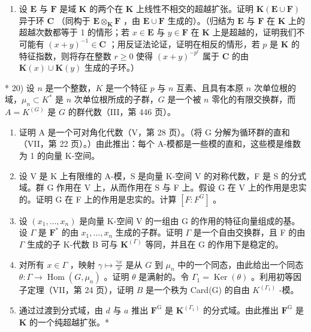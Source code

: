 \begin{enumerate}
\def\labelenumi{\arabic{enumi})}
\setcounter{enumi}{18}
\tightlist
\item
  设 \(\mathbf{E}\) 与 \(\mathbf{F}\) 是域 \(\mathbf{K}\) 的两个在 \(\mathbf{K}\) 上线性不相交的超越扩张。证明 \(\mathbf{K}(\mathbf{E} \cup \mathbf{F})\) 异于环 \(\mathbf{C}\) （同构于 \(\mathbf{E} \otimes_{\mathbf{K}} \mathbf{F}\) ，由 \(\mathbf{E} \cup \mathbf{F}\) 生成的）。（归结为 \(\mathbf{E}\) 与 \(\mathbf{F}\) 在 \(\mathbf{K}\) 上的超越次数都等于 1 的情形；若 \(x \in \mathbf{E}\) 与 \(y \in \mathbf{F}\) 在 \(\mathbf{K}\) 上是超越的，证明我们不可能有 \((x + y)^{-1} \in \mathbf{C}\) ；用反证法论证，证明在相反的情形，若 \(p\) 是 \(\mathbf{K}\) 的特征指数，则将存在整数 \(r \geqslant 0\) 使得 \((x + y)^{-p^r}\) 属于 \(\mathbf{C}\) 的由 \(\mathbf{K}(x) \cup \mathbf{K}(y)\) 生成的子环。）
\end{enumerate}

* 20) 设 \(n\) 是一个整数，\(K\) 是一个特征 \(p\) 与 \(n\) 互素、且具有本原 \(n\) 次单位根的域，\(\mu_n \subset K^*\) 是 \(n\) 次单位根所成的子群，\(G\) 是一个被 \(n\) 零化的有限交换群，而 \(A = K^{(G)}\) 是 \(G\) 的群代数（III，第 446 页）。

\begin{enumerate}
\def\labelenumi{\alph{enumi})}
\item
  证明 A 是一个可对角化代数（V，第 28 页）。（将 G 分解为循环群的直和（VII，第 22 页）。）由此推出：每个 A-模都是一些模的直和，这些模是维数为 1 的向量 K-空间。
\item
  设 V 是 K 上有限维的 A-模，S 是向量 K-空间 V 的对称代数，F 是 S 的分式域。群 G 作用在 V 上，从而作用在 S 与 F 上。假设 G 在 V 上的作用是忠实的。证明 G 在 F 上的作用是忠实的。计算 \([F : F^{G}]\) 。
\item
  设 \((x_{1},\ldots ,x_{n})\) 是向量 K-空间 V 的一组由 G 的作用的特征向量组成的基。设 \(\Gamma\) 是 \(\mathbf{F}^*\) 的由 \(x_{1},\ldots ,x_{n}\) 生成的子群。证明 \(\Gamma\) 是一个自由交换群，且 F 的由 \(\Gamma\) 生成的子 K-代数 B 可与 \(\mathbf{K}^{(\Gamma)}\) 等同，并且在 G 的作用下是稳定的。
\item
  对所有 \(x \in \Gamma\) ，映射 \(\gamma \mapsto \frac{\gamma x}{x}\) 是从 \(G\) 到 \(\mu_n\) 中的一个同态，由此给出一个同态 \(\theta: \Gamma \to \operatorname{Hom}(G, \mu_n)\) 。证明 \(\theta\) 是满射的。令 \(\Gamma_1 = \operatorname{Ker}(\theta)\) 。利用初等因子定理（VII，第 24 页），证明 \(B\) 是一个秩为 Card(G) 的自由 \(K^{(\Gamma_1)}\) -模。
\item
  通过过渡到分式域，由 \(d\) 与 \(a\) 推出 \(\mathbf{F}^{\mathrm{G}}\) 是 \(\mathbf{K}^{(\Gamma_1)}\) 的分式域。由此推出 \(\mathbf{F}^{\mathrm{G}}\) 是 \(\mathbf{K}\) 的一个纯超越扩张。*
\end{enumerate}

